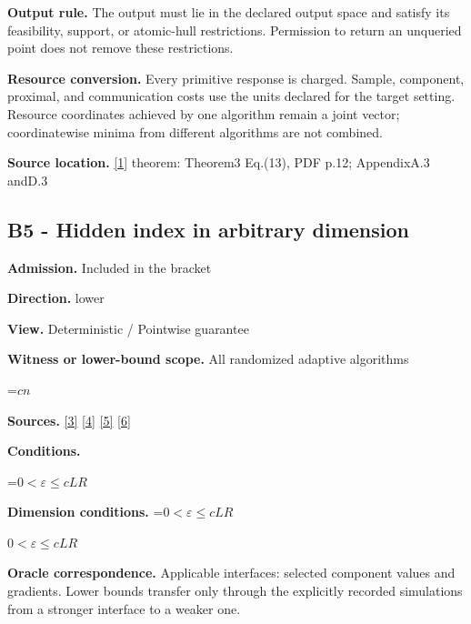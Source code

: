 \documentclass[10pt,a4paper]{article}
\newcommand{\AtlasMath}[1]{\par\begingroup\centering\setbox0=\hbox{$\displaystyle #1$}\ifdim\wd0>1.4\linewidth\typeout{ATLAS WIDE FORMULA: \the\wd0}\fi\ifdim\wd0>\linewidth\resizebox{\linewidth}{!}{\box0}\else\box0\fi\par\endgroup}
\newcommand{\AtlasInlineMath}[1]{\begingroup\setbox0=\hbox{$#1$}\ifdim\wd0>.4\linewidth\endgroup\AtlasMath{#1}\else\endgroup$#1$\fi}
\begin{document}
\textbf{Output rule.} The output must lie in the declared output space and satisfy its feasibility, support, or atomic-hull restrictions. Permission to return an unqueried point does not remove these restrictions.



\textbf{Resource conversion.} Every primitive response is charged. Sample, component, proximal, and communication costs use the units declared for the target setting. Resource coordinates achieved by one algorithm remain a joint vector; coordinatewise minima from different algorithms are not combined.



\textbf{Source location.} \href{https://arxiv.org/pdf/2105.01778}{[1]} theorem: Theorem3 Eq.(13), PDF p.12; AppendixA.3 andD.3



\subsection{B5 - Hidden index in arbitrary dimension}


\textbf{Admission.} Included in the bracket



\textbf{Direction.} lower



\textbf{View.} Deterministic / Pointwise guarantee



\textbf{Witness or lower-bound scope.} All randomized adaptive algorithms



\AtlasMath{cn}


\textbf{Sources.} \href{https://arxiv.org/pdf/2311.10886}{[3]} \href{https://arxiv.org/pdf/1405.4980}{[4]} \href{https://www2.isye.gatech.edu/~nemirovs/MOR_AccuracyCertificates.pdf}{[5]} \href{https://arxiv.org/pdf/2609.20701}{[6]}



\textbf{Conditions.}
\AtlasMath{0<\varepsilon\le cLR}




\textbf{Dimension conditions.} \AtlasInlineMath{0<\varepsilon\le cLR}



\textbf{Oracle correspondence.} Applicable interfaces: selected component values and gradients. Lower bounds transfer only through the explicitly recorded simulations from a stronger interface to a weaker one.
\end{document}
